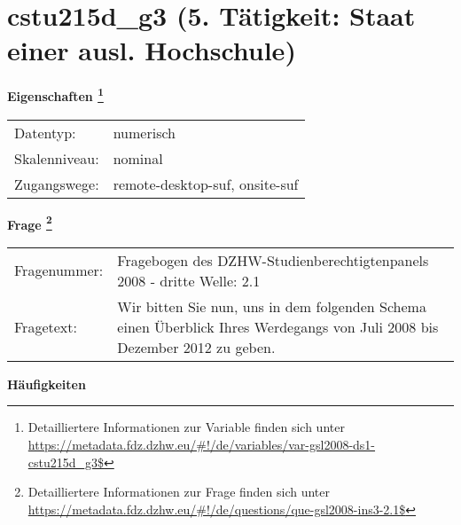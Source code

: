 
    \setcounter{footnote}{0}

    \vspace*{-1.8cm}
	\section{cstu215d\_g3 (5. Tätigkeit: Staat einer ausl. Hochschule)}
	\label{section:cstu215d_g3}



    \vspace*{0.5cm}
    \noindent\textbf{Eigenschaften
	\footnote{Detailliertere Informationen zur Variable finden sich unter
		\url{https://metadata.fdz.dzhw.eu/\#!/de/variables/var-gsl2008-ds1-cstu215d_g3$}}}\\
	\begin{tabularx}{\hsize}{@{}lX}
	Datentyp: & numerisch \\
	Skalenniveau: & nominal \\
	Zugangswege: &
	  remote-desktop-suf, 
	  onsite-suf
 \\
    \end{tabularx}



				\vspace*{0.5cm}
                \noindent\textbf{Frage
	                \footnote{Detailliertere Informationen zur Frage finden sich unter
		              \url{https://metadata.fdz.dzhw.eu/\#!/de/questions/que-gsl2008-ins3-2.1$}}}\\
				\begin{tabularx}{\hsize}{@{}lX}
					Fragenummer: &
					  Fragebogen des DZHW-Studienberechtigtenpanels 2008 - dritte Welle:
					  2.1
 \\
					Fragetext: & Wir bitten Sie nun, uns in dem folgenden Schema einen Überblick Ihres Werdegangs von Juli 2008 bis Dezember 2012 zu geben. \\
				\end{tabularx}





        		\vspace*{0.5cm}
                \noindent\textbf{Häufigkeiten}

